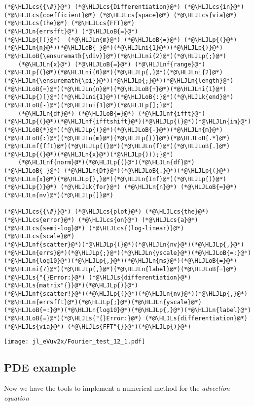 \documentclass[12pt,a4paper]{article}
\newcommand{\HLJLk}[1]{\textcolor[RGB]{148,91,176}{\textbf{#1}}}
\newcommand{\HLJLn}[1]{#1}
\newcommand{\HLJLnf}[1]{\textcolor[RGB]{66,102,213}{#1}}
\newcommand{\HLJLs}[1]{\textcolor[RGB]{201,61,57}{#1}}
\newcommand{\HLJLni}[1]{\textcolor[RGB]{59,151,46}{#1}}
\newcommand{\HLJLoB}[1]{\textcolor[RGB]{102,102,102}{\textbf{#1}}}
\newcommand{\HLJLp}[1]{#1}
\newcommand{\HLJLcs}[1]{\textcolor[RGB]{153,153,119}{\textit{#1}}}
\begin{document}
\begin{lstlisting}
(*@\HLJLcs{{\#}}@*) (*@\HLJLcs{Differentiation}@*) (*@\HLJLcs{in}@*) (*@\HLJLcs{coefficient}@*) (*@\HLJLcs{space}@*) (*@\HLJLcs{via}@*) (*@\HLJLcs{the}@*) (*@\HLJLcs{FFT}@*)
(*@\HLJLn{errsfft}@*) (*@\HLJLoB{=}@*) 
(*@\HLJLp{[(}@*)  (*@\HLJLn{m}@*) (*@\HLJLoB{=}@*) (*@\HLJLp{(}@*)(*@\HLJLn{n}@*)(*@\HLJLoB{-}@*)(*@\HLJLni{1}@*)(*@\HLJLp{)}@*)(*@\HLJLoB{\ensuremath{\div}}@*)(*@\HLJLni{2}@*)(*@\HLJLp{;}@*)
    (*@\HLJLn{x}@*) (*@\HLJLoB{=}@*) (*@\HLJLnf{range}@*)(*@\HLJLp{(}@*)(*@\HLJLni{0}@*)(*@\HLJLp{,}@*)(*@\HLJLni{2}@*)(*@\HLJLn{\ensuremath{\pi}}@*)(*@\HLJLp{;}@*)(*@\HLJLn{length}@*)(*@\HLJLoB{=}@*)(*@\HLJLn{n}@*)(*@\HLJLoB{+}@*)(*@\HLJLni{1}@*)(*@\HLJLp{)[}@*)(*@\HLJLni{1}@*)(*@\HLJLoB{:}@*)(*@\HLJLk{end}@*)(*@\HLJLoB{-}@*)(*@\HLJLni{1}@*)(*@\HLJLp{];}@*)
    (*@\HLJLn{df}@*) (*@\HLJLoB{=}@*) (*@\HLJLnf{ifft}@*)(*@\HLJLp{(}@*)(*@\HLJLnf{ifftshift}@*)(*@\HLJLp{(}@*)(*@\HLJLn{im}@*)(*@\HLJLoB{*}@*)(*@\HLJLp{(}@*)(*@\HLJLoB{-}@*)(*@\HLJLn{m}@*)(*@\HLJLoB{:}@*)(*@\HLJLn{m}@*)(*@\HLJLp{))}@*)(*@\HLJLoB{.*}@*)(*@\HLJLnf{fft}@*)(*@\HLJLp{(}@*)(*@\HLJLn{f}@*)(*@\HLJLoB{.}@*)(*@\HLJLp{(}@*)(*@\HLJLn{x}@*)(*@\HLJLp{)));}@*)
    (*@\HLJLnf{norm}@*)(*@\HLJLp{(}@*)(*@\HLJLn{df}@*) (*@\HLJLoB{-}@*) (*@\HLJLn{Df}@*)(*@\HLJLoB{.}@*)(*@\HLJLp{(}@*)(*@\HLJLn{x}@*)(*@\HLJLp{),}@*)(*@\HLJLn{Inf}@*)(*@\HLJLp{)}@*) (*@\HLJLp{)}@*) (*@\HLJLk{for}@*) (*@\HLJLn{n}@*) (*@\HLJLoB{=}@*) (*@\HLJLn{nv}@*)(*@\HLJLp{]}@*)

(*@\HLJLcs{{\#}}@*) (*@\HLJLcs{plot}@*) (*@\HLJLcs{the}@*) (*@\HLJLcs{error}@*) (*@\HLJLcs{on}@*) (*@\HLJLcs{a}@*) (*@\HLJLcs{semi-log}@*) (*@\HLJLcs{(log-linear)}@*) (*@\HLJLcs{scale}@*)
(*@\HLJLnf{scatter}@*)(*@\HLJLp{(}@*)(*@\HLJLn{nv}@*)(*@\HLJLp{,}@*)(*@\HLJLn{errs}@*)(*@\HLJLp{;}@*)(*@\HLJLn{yscale}@*)(*@\HLJLoB{=:}@*)(*@\HLJLn{log10}@*)(*@\HLJLp{,}@*)(*@\HLJLn{ms}@*)(*@\HLJLoB{=}@*)(*@\HLJLni{7}@*)(*@\HLJLp{,}@*)(*@\HLJLn{label}@*)(*@\HLJLoB{=}@*)(*@\HLJLs{"{}Error:}@*) (*@\HLJLs{differentiation}@*) (*@\HLJLs{matrix"{}}@*)(*@\HLJLp{)}@*)
(*@\HLJLnf{scatter!}@*)(*@\HLJLp{(}@*)(*@\HLJLn{nv}@*)(*@\HLJLp{,}@*)(*@\HLJLn{errsfft}@*)(*@\HLJLp{;}@*)(*@\HLJLn{yscale}@*)(*@\HLJLoB{=:}@*)(*@\HLJLn{log10}@*)(*@\HLJLp{,}@*)(*@\HLJLn{label}@*)(*@\HLJLoB{=}@*)(*@\HLJLs{"{}Error:}@*) (*@\HLJLs{differentiation}@*) (*@\HLJLs{via}@*) (*@\HLJLs{FFT"{}}@*)(*@\HLJLp{)}@*)
\end{lstlisting}

\texttt{[image: jl\_eVuv2x/Fourier\_test\_12\_1.pdf]}

\subsection{PDE example}
Now we have the tools to implement a numerical method for the \emph{advection equation}
\end{document}
